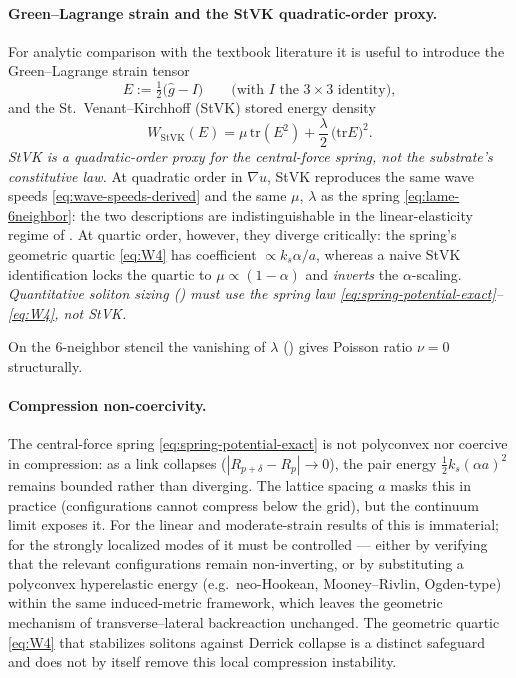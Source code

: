 \paragraph{Green--Lagrange strain and the StVK quadratic-order proxy.}
For analytic comparison with the textbook literature it is useful to introduce the
Green--Lagrange strain tensor
\begin{equation}
  E := \tfrac12\big(\widehat g - I\big)
  \qquad\text{(with $I$ the $3\times 3$ identity)},
  \label{eq:green-lagrange-strain}
\end{equation}
and the St.\ Venant--Kirchhoff (StVK) stored energy density
\begin{equation}
  W_{\text{StVK}}(E)
  = \mu\,\mathrm{tr}(E^2)+\frac{\lambda}{2}\,\big(\mathrm{tr}E\big)^2.
  \label{eq:stvk}
\end{equation}
\emph{StVK is a quadratic-order proxy for the central-force spring, not the substrate's
constitutive law.}
At quadratic order in $\nabla u$, StVK reproduces the same wave speeds \eqref{eq:wave-speeds-derived}
and the same $\mu$, $\lambda$ as the spring \eqref{eq:lame-6neighbor}: the two descriptions
are indistinguishable in the linear-elasticity regime of .
At quartic order, however, they diverge critically: the spring's geometric quartic
\eqref{eq:W4} has coefficient $\propto k_s\alpha/a$, whereas a naive StVK identification
locks the quartic to $\mu\propto(1-\alpha)$ and \emph{inverts} the $\alpha$-scaling.
\emph{Quantitative soliton sizing () must use the spring law
\eqref{eq:spring-potential-exact}--\eqref{eq:W4}, not StVK.}

On the 6-neighbor stencil the vanishing of $\lambda$ () gives Poisson ratio $\nu=0$ structurally.

\paragraph{Compression non-coercivity.}
The central-force spring \eqref{eq:spring-potential-exact} is not polyconvex nor coercive in
compression: as a link collapses ($|R_{p+\delta}-R_p|\to 0$), the pair energy
$\tfrac12 k_s(\alpha a)^2$ remains bounded rather than diverging.
The lattice spacing $a$ masks this in practice (configurations cannot compress below the
grid), but the continuum limit exposes it.
For the linear and moderate-strain results of 
this is immaterial; for the strongly localized modes of  it must be
controlled --- either by verifying that the relevant configurations remain non-inverting, or
by substituting a polyconvex hyperelastic energy (e.g.\ neo-Hookean, Mooney--Rivlin,
Ogden-type) within the same induced-metric framework, which leaves the geometric mechanism
of transverse--lateral backreaction unchanged.
The geometric quartic \eqref{eq:W4} that stabilizes solitons against Derrick collapse is
a distinct safeguard and does not by itself remove this local compression instability.

